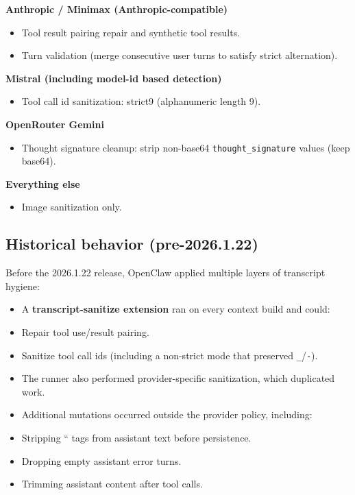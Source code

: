 \textbf{Anthropic / Minimax (Anthropic-compatible)}

\begin{itemize}
  \item Tool result pairing repair and synthetic tool results.
  \item Turn validation (merge consecutive user turns to satisfy strict alternation).
\end{itemize}


\textbf{Mistral (including model-id based detection)}

\begin{itemize}
  \item Tool call id sanitization: strict9 (alphanumeric length 9).
\end{itemize}


\textbf{OpenRouter Gemini}

\begin{itemize}
  \item Thought signature cleanup: strip non-base64 \texttt{thought\_signature} values (keep base64).
\end{itemize}


\textbf{Everything else}

\begin{itemize}
  \item Image sanitization only.
\end{itemize}


\hrulefill


\subsection{Historical behavior (pre-2026.1.22)}


Before the 2026.1.22 release, OpenClaw applied multiple layers of transcript hygiene:

\begin{itemize}
  \item A \textbf{transcript-sanitize extension} ran on every context build and could:
  \item Repair tool use/result pairing.
  \item Sanitize tool call ids (including a non-strict mode that preserved \texttt{\_}/\texttt{-}).
  \item The runner also performed provider-specific sanitization, which duplicated work.
  \item Additional mutations occurred outside the provider policy, including:
  \item Stripping `` tags from assistant text before persistence.
  \item Dropping empty assistant error turns.
  \item Trimming assistant content after tool calls.
\end{itemize}



